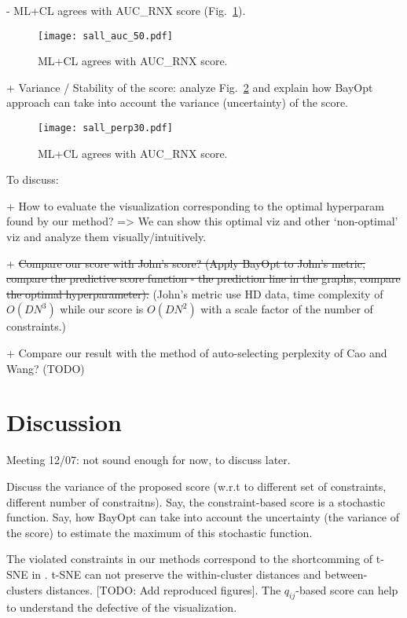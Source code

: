 \hspace{10pt }- ML+CL agrees with AUC\_RNX score (Fig.~\ref{fig:sall}).
\begin{figure}
\centering
\texttt{[image: sall\_auc\_50.pdf]}
\caption{ML+CL agrees with AUC\_RNX score.}\label{fig:sall}
\end{figure}

\vspace{8pt} \par
+ Variance / Stability of the score: analyze Fig.~\ref{fig:svar} and explain how BayOpt approach can take into account the variance (uncertainty) of the score.
\begin{figure}
\centering
\texttt{[image: sall\_perp30.pdf]}
\caption{ML+CL agrees with AUC\_RNX score.}\label{fig:svar}
\end{figure}


\vspace{8pt} \par
To discuss:

+ How to evaluate the visualization corresponding to the optimal hyperparam found by our method? => We can show this optimal viz and other `non-optimal' viz and analyze them visually/intuitively.

+ \st{Compare our score with John's score? (Apply BayOpt to John's metric, compare the predictive score function - the prediction line in the graphs, compare the optimal hyperparameter).}
(John's metric use HD data, time complexity of $O(DN^3)$ while our score is $O(DN^2)$ with a scale factor of the number of constraints.)

+ Compare our result with the method of auto-selecting perplexity of Cao and Wang? (TODO)



\section{Discussion}
Meeting 12/07: not sound enough for now, to discuss later.

\par
Discuss the variance of the proposed score (w.r.t to different set of constraints, different number of constraitns).
Say, the constraint-based score is a stochastic function.
Say, how BayOpt can take into account the uncertainty (the variance of the score) to estimate the maximum of this stochastic function.


\par
The violated constraints in our methods correspond to the shortcomming of t-SNE in \cite{wattenberg2016use}.
t-SNE can not preserve the within-cluster distances and between-clusters distances.
[TODO: Add reproduced figures].
The $q_{ij}$-based score can help to understand the defective of the visualization.

